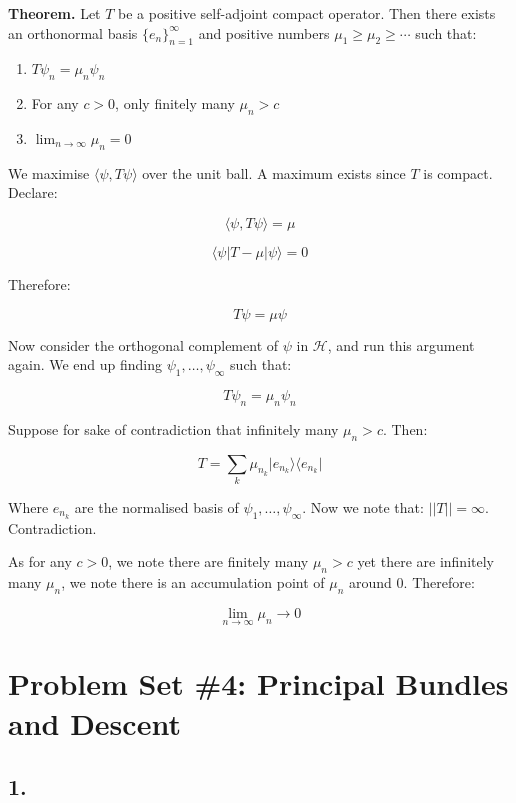 \begin{enumerate}
    \textbf{Theorem.} Let $T$ be a positive self-adjoint compact operator. Then there exists an orthonormal basis $\{e_n\}_{n=1}^\infty$ and positive numbers $\mu_1 \ge \mu_2 \ge \cdots$ such that:
    \begin{enumerate}
        \item[(i)] $T\psi_n = \mu_n \psi_n$
        \item[(ii)] For any $c > 0$, only finitely many $\mu_n > c$
        \item[(iii)] $\lim_{n \to \infty} \mu_n = 0$
    \end{enumerate}

    We maximise $\langle \psi, T\psi \rangle$ over the unit ball. A maximum exists since $T$ is compact. Declare:

    $$\langle \psi, T \psi \rangle = \mu$$

    $$\langle \psi \vert T - \mu \vert \psi \rangle = 0$$

    Therefore:

    $$T \psi = \mu \psi$$

    Now consider the orthogonal complement of $\psi$ in $\mathcal{H}$, and run this argument again. We end up finding $\psi_{1}, \dots, \psi_{\infty}$ such that:

    $$T \psi_{n} = \mu_{n} \psi_{n}$$

    Suppose for sake of contradiction that infinitely many $\mu_{n} > c$. Then:

    $$T = \sum_{k} \mu_{n_{k}} \vert e_{n_{k}} \rangle \langle e_{n_{k}} \vert$$

    Where $e_{n_{k}}$ are the normalised basis of $\psi_{1}, \dots, \psi_{\infty}$. Now we note that: $||T|| = \infty$. Contradiction.

    As for any $c > 0$, we note there are finitely many $\mu_{n} > c$ yet there are infinitely many $\mu_{n}$, we note there is an accumulation point of $\mu_{n}$ around $0$. Therefore:

    $$\lim_{n \to \infty} \mu_{n} \to 0$$

    
\end{enumerate}

\newpage

\section*{Problem Set \#4: Principal Bundles and Descent}

\subsection*{1.}

